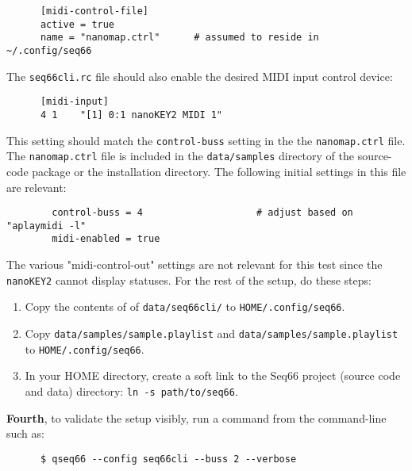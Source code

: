    \begin{verbatim}
      [midi-control-file]
      active = true
      name = "nanomap.ctrl"      # assumed to reside in ~/.config/seq66
   \end{verbatim}

   The \texttt{seq66cli.rc} file should also enable the desired MIDI input
   control device:

   \begin{verbatim}
      [midi-input]
      4 1    "[1] 0:1 nanoKEY2 MIDI 1"
   \end{verbatim}

   This setting should match the \texttt{control-buss} setting in the
   the \texttt{nanomap.ctrl} file.  The \texttt{nanomap.ctrl} file is included
   in the \texttt{data/samples} directory of the source-code package or the
   installation directory.  The following initial settings in this file are
   relevant:

   \begin{verbatim}
		control-buss = 4					# adjust based on "aplaymidi -l"
		midi-enabled = true
   \end{verbatim}

   The various "midi-control-out" settings are not relevant for this test since
   the \texttt{nanoKEY2} cannot display statuses.
   For the rest of the setup, do these steps:

   \begin{enumerate}
      \item Copy the contents of of \texttt{data/seq66cli/} to
         \texttt{HOME/.config/seq66}.
      \item Copy \texttt{data/samples/sample.playlist} and
         \texttt{data/samples/sample.playlist} to \linebreak
         \texttt{HOME/.config/seq66}.
      \item In your HOME directory, create a soft link to the Seq66 project
         (source code and data) directory: \texttt{ln -s path/to/seq66}.
   \end{enumerate}

   \textbf{Fourth}, to validate the setup visibly, run a command from the
   command-line such as:

   \begin{verbatim}
      $ qseq66 --config seq66cli --buss 2 --verbose
   \end{verbatim}


